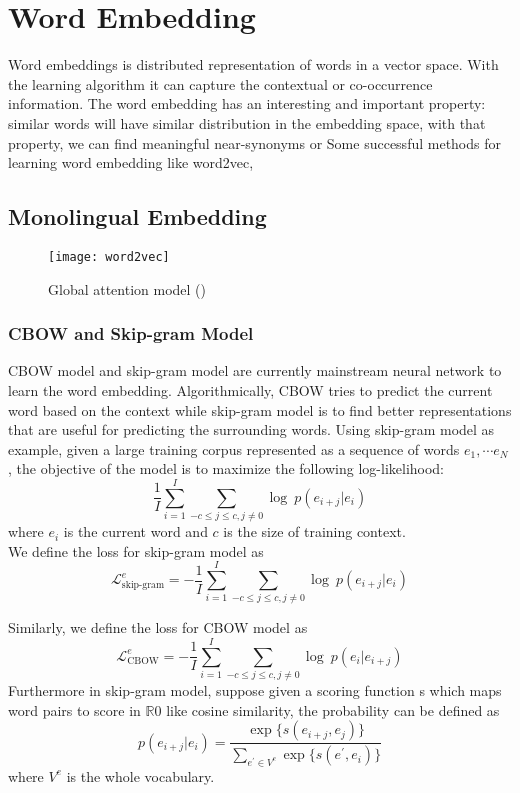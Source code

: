 \chapter{Word Embedding}
Word embeddings is distributed representation of words in a vector space. With the learning algorithm it can capture the contextual or co-occurrence information. The word embedding has an interesting and important property: similar words will have similar distribution in the embedding space, with that property, we can find meaningful near-synonyms or  Some successful methods for learning word embedding like word2vec\cite{mikolov2013distributed}, \cite{pennington2014glove}

\section{Monolingual Embedding}
\begin{figure}[h]
	\texttt{[image: word2vec]}
	\caption{Global attention model (\cite{mikolov2013efficient})}
	\centering
\end{figure}
\subsection{CBOW and Skip-gram Model}
CBOW model and skip-gram model are currently mainstream neural network to learn the word embedding. Algorithmically,  CBOW tries to predict the current word based on the context while skip-gram model is to find better representations that are useful for predicting the surrounding words. Using skip-gram model as example, given a large training corpus represented as a sequence of words ${e_1, \cdots e_N}$, the objective of the model is to maximize the following log-likelihood:
\[ \frac{1}{I} \sum_{i=1}^{I} \sum_{ -c \le j \le c, j\ne 0} \log\ {p(e_{i+j}|e_i)} \]
where $e_i$ is the current word and $c$ is the size of training context. \\
We define the loss for skip-gram model as
\[ \mathcal{L}^e_{\text{skip-gram}} = - \frac{1}{I} \sum_{i=1}^{I} \sum_{ -c \le j \le c, j\ne 0} \log\ {p(e_{i+j}|e_i)}\]

Similarly, we define the loss for CBOW model as
\[ \mathcal{L}^e_{\text{CBOW}} = - \frac{1}{I} \sum_{i=1}^{I} \sum_{ -c \le j \le c, j\ne 0} \log\ {p(e_{i}|e_{i+j})}\]
Furthermore in skip-gram model, suppose given a scoring function s which maps word pairs to score in $\mathbb{R}0$ like cosine similarity, the probability can be defined as
\[ p(e_{i+j} | e_i)  = \frac{\exp\{s(e_{i+j}, e_j)\}}{\sum_{e^{\prime} \in V^e }{\exp\{s( e^{\prime}, e_i)\}}}\]
where $V^e$ is the whole vocabulary. \\

